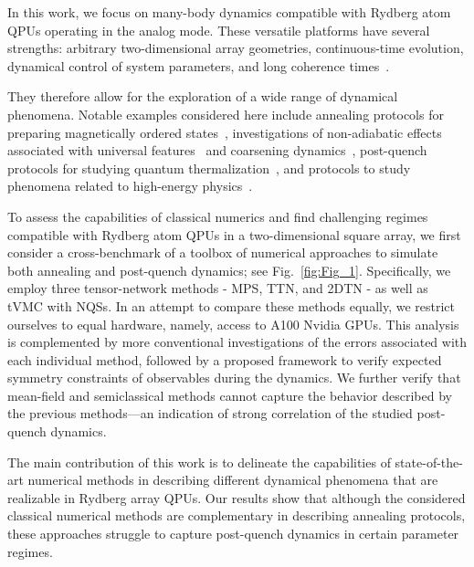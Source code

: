\documentclass[aps,pra,reprint,amssymb,superscriptaddress]{revtex4-2}
\begin{document}
In this work, we focus on many-body dynamics compatible with Rydberg atom QPUs operating in the analog mode. These versatile platforms have several strengths: arbitrary two-dimensional array geometries, continuous-time evolution, dynamical control of system parameters, and long coherence times~\cite{browaeys_many-body_2020, saffman_quantum_2010, henriet_quantum_2020}. 

They therefore allow for the exploration of a wide range of dynamical phenomena. Notable examples considered here include annealing protocols for preparing magnetically ordered states~\cite{scholl_quantum_2021, ebadi_quantum_2021, semeghini_probing_2021}, investigations of non-adiabatic effects associated with universal features~\cite{keesling_quantum_2019} and coarsening dynamics~\cite{manovitz_quantum_2025}, post-quench protocols for studying quantum thermalization~\cite{shaw_benchmarking_2024, choi_preparing_2023, shaw_experimental_2025, darbha_probing_2025}, and protocols to study phenomena related to high-energy physics~\cite{vovrosh_meson_2025, mark_observation_2025, gonzalez-cuadra_observation_2025}.

To assess the capabilities of classical numerics and find challenging regimes compatible with Rydberg atom QPUs in a two-dimensional square array, we first consider a cross-benchmark of a toolbox of numerical approaches to simulate both annealing and post-quench dynamics; see Fig.~\ref{fig:Fig_1}.
Specifically, we employ three tensor-network methods - MPS, TTN, and 2DTN - as well as tVMC with NQSs. In an attempt to compare these methods equally, we restrict ourselves to equal hardware, namely, access to A100 Nvidia GPUs.
This analysis is complemented by more conventional investigations of the errors associated with each individual method, followed by a proposed framework to verify expected symmetry constraints of observables during the dynamics. We further verify that mean-field and semiclassical methods cannot capture the behavior described by the previous methods---an indication of strong correlation of the studied post-quench dynamics.

The main contribution of this work is to delineate the capabilities of state-of-the-art numerical methods in describing different dynamical phenomena that are realizable in Rydberg array QPUs. Our results show that although the considered classical numerical methods are complementary in describing annealing protocols, these approaches struggle to capture post-quench dynamics in certain parameter regimes.
\end{document}
